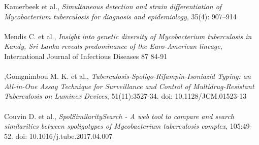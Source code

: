 \documentclass[twoside,a4paper,11pt,frenchb,openany]{report}
\begin{document}
\begin{spacing}{0.5}
\begin{thebibliography}{10}
Kamerbeek et al., \textit{Simultaneous detection and strain differentiation of Mycobacterium tuberculosis for diagnosis and epidemiology}, 35(4): 907–914\\ \\

Mendis C. et al., \textit{Insight into genetic diversity of Mycobacterium tuberculosis in Kandy, Sri Lanka reveals predominance of the Euro-American lineage}, International Journal of Infectious Diseases 87 84-91\\ \\

,Gomgnimbou M. K. et al., \textit{Tuberculosis-Spoligo-Rifampin-Isoniazid Typing: an All-in-One Assay Technique for Surveillance and Control of Multidrug-Resistant Tuberculosis on Luminex Devices}, 51(11):3527-34. doi: 10.1128/JCM.01523-13\\ \\

Couvin D. et al., \textit{SpolSimilaritySearch - A web tool to compare and search similarities between spoligotypes of Mycobacterium tuberculosis complex}, 105:49-52. doi: 10.1016/j.tube.2017.04.007


\end{thebibliography}
\end{spacing}
\end{document}
